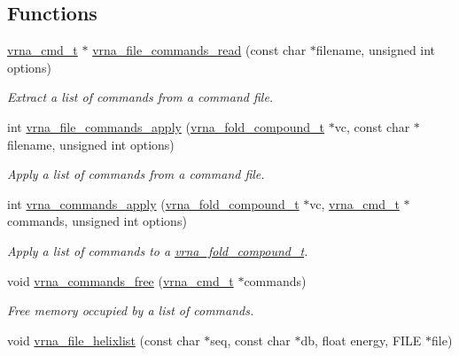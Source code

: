 \subsection*{Functions}
\begin{DoxyCompactItemize}
\item 
\hyperlink{group__file__utils_ga92cb3b5952352b103bcb32e5a99e0e5a}{vrna\+\_\+cmd\+\_\+t} $\ast$ \hyperlink{group__file__utils_ga5d2a64331cff5b1059e7d327545d8a63}{vrna\+\_\+file\+\_\+commands\+\_\+read} (const char $\ast$filename, unsigned int options)
\begin{DoxyCompactList}\small\item\em Extract a list of commands from a command file. \end{DoxyCompactList}\item 
int \hyperlink{group__file__utils_gadbe8c9622f7bcc6dcbe3448b98df8656}{vrna\+\_\+file\+\_\+commands\+\_\+apply} (\hyperlink{group__fold__compound_ga1b0cef17fd40466cef5968eaeeff6166}{vrna\+\_\+fold\+\_\+compound\+\_\+t} $\ast$vc, const char $\ast$filename, unsigned int options)
\begin{DoxyCompactList}\small\item\em Apply a list of commands from a command file. \end{DoxyCompactList}\item 
int \hyperlink{group__file__utils_ga5e993fc4b9602af73aaaab4d3b3cd9a9}{vrna\+\_\+commands\+\_\+apply} (\hyperlink{group__fold__compound_ga1b0cef17fd40466cef5968eaeeff6166}{vrna\+\_\+fold\+\_\+compound\+\_\+t} $\ast$vc, \hyperlink{group__file__utils_ga92cb3b5952352b103bcb32e5a99e0e5a}{vrna\+\_\+cmd\+\_\+t} $\ast$commands, unsigned int options)
\begin{DoxyCompactList}\small\item\em Apply a list of commands to a \hyperlink{group__fold__compound_ga1b0cef17fd40466cef5968eaeeff6166}{vrna\+\_\+fold\+\_\+compound\+\_\+t}. \end{DoxyCompactList}\item 
void \hyperlink{group__file__utils_ga926fd7632e68f3da2e2069402b80b1ab}{vrna\+\_\+commands\+\_\+free} (\hyperlink{group__file__utils_ga92cb3b5952352b103bcb32e5a99e0e5a}{vrna\+\_\+cmd\+\_\+t} $\ast$commands)
\begin{DoxyCompactList}\small\item\em Free memory occupied by a list of commands. \end{DoxyCompactList}\item 
void \hyperlink{group__file__utils_gaaface7db12fadc3d271641c4515ab6e4}{vrna\+\_\+file\+\_\+helixlist} (const char $\ast$seq, const char $\ast$db, float energy, F\+I\+LE $\ast$file)

\end{DoxyCompactItemize}
